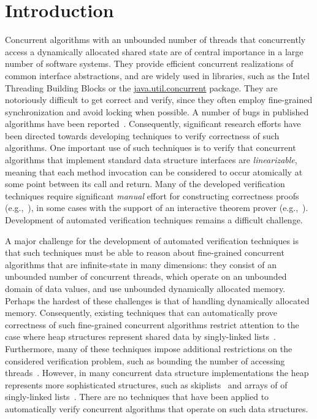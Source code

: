 \section{Introduction}



Concurrent algorithms with an unbounded number of
threads that concurrently access a dynamically allocated shared state
are of central importance in a large number of software systems.
They provide efficient concurrent realizations of
common interface abstractions, and
are widely used in libraries,
such as the Intel Threading Building Blocks or
the \url{java.util.concurrent} package.
They are notoriously difficult to get correct and verify, since they
often employ fine-grained synchronization and avoid locking when
possible. A number of bugs  in published
algorithms have been reported~\cite{DDGJLMMSS:dcas,MiSc:correction}.
Consequently, significant research efforts have been directed towards developing
techniques to verify correctness of such algorithms. One important use
of such techniques is
to verify that concurrent algorithms that implement standard data structure
interfaces are {\em linearizable}, meaning that
each method invocation can be considered to occur atomically at some point
between its call and return.
Many of the developed verification techniques require significant
{\em manual} effort for constructing correctness proofs
(e.g.,~\cite{LF:pldi13,Vafeiadis:Thesis}),
in some cases with the support of an interactive theorem prover
(e.g.,~\cite{Aaron:logical:linearizability,Colvin:Lazy-List,Derrick:fm14,SWD:cav12,SDW:tcl14}).
Development of automated verification techniques remains a difficult challenge.

A major challenge for the development of automated verification techniques
is that such techniques must be
able to reason about fine-grained concurrent algorithms that are infinite-state
in many dimensions:
they consist of an unbounded number of concurrent threads, which
operate on an unbounded domain of data values, and use
unbounded dynamically allocated memory. 
Perhaps the hardest of these challenges is that of handling 
dynamically allocated memory.
Consequently, existing techniques that can automatically prove correctness
of such fine-grained concurrent algorithms restrict attention to the
case where heap structures represent shared data by singly-linked 
lists~\cite{AHHR:integrated,meyer:vmcai16,Quy:sas16,Sagiv:correlation,Vafeiadis:cav10}. Furthermore, many of these techniques impose additional restrictions on the considered verification problem, such as bounding the number of accessing
threads~\cite{Amit:comparisonAbstraction,Vechev:spin09,CernyRZCA:CAV10}.
However, in many concurrent data structure implementations the heap represents
more sophisticated structures, such as 
skiplists~\cite{Fomitchev:2004,ArtOfMpP,Sundell:2005} and arrays of
of singly-linked lists~\cite{ts-stack}. There are no
techniques that have been applied to automatically verify concurrent algorithms
that operate on such data structures.

